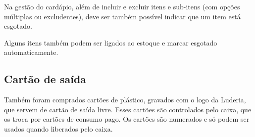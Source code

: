 Na gestão do cardápio, além de incluir e excluir itens e sub-itens (com opções múltiplas ou excludentes), deve ser também possível indicar que um item está esgotado.

Alguns itens também podem ser ligados ao estoque e marcar esgotado automaticamente.


\subsection{Cartão de saída}
Também foram comprados cartões de plástico, gravados com o logo da Luderia,  que servem de cartão de saída livre. Esses cartões são controlados pelo caixa, que os troca por cartões de consumo pago. Os cartões são numerados e só podem ser usados quando liberados pelo caixa.





